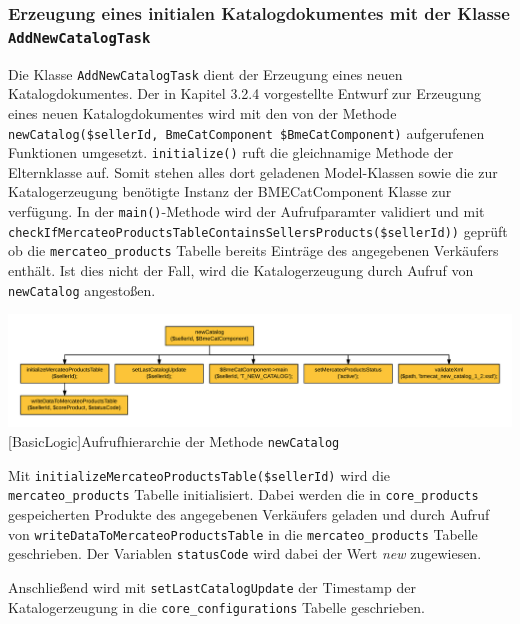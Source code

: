 	\subsubsection{Erzeugung eines initialen Katalogdokumentes mit der Klasse \texttt{AddNewCatalogTask}}
	
	Die Klasse \texttt{AddNewCatalogTask} dient der Erzeugung eines neuen Katalogdokumentes. Der in Kapitel 3.2.4 vorgestellte Entwurf zur Erzeugung eines neuen Katalogdokumentes wird mit den von der Methode \texttt{newCatalog(\$sellerId, BmeCatComponent \$BmeCatComponent)} aufgerufenen Funktionen umgesetzt.
	\texttt{initialize()} ruft die gleichnamige Methode der Elternklasse auf. Somit stehen alles dort geladenen Model-Klassen sowie die zur Katalogerzeugung benötigte Instanz der BMECatComponent Klasse zur verfügung.
	In der \texttt{main()}-Methode wird der Aufrufparamter validiert und mit \texttt{checkIfMercateoProductsTableContainsSellersProducts(\$sellerId))} geprüft ob die \texttt{mercateo\_products} Tabelle bereits Einträge des angegebenen Verkäufers enthält. Ist dies nicht der Fall, wird die Katalogerzeugung durch Aufruf von \texttt{newCatalog} angestoßen.
	
	 
	\begin{minipage}{\linewidth}
		\vspace{1em}
		\centering
		\includegraphics[width=1 \linewidth]{img/newCatalogAufrufhierarchie}
		[BasicLogic]{Aufrufhierarchie der Methode \texttt{newCatalog}}
		\vspace{1em}
	\end{minipage}

	
	Mit \texttt{initializeMercateoProductsTable(\$sellerId)} wird die \texttt{mercateo\_products} Tabelle initialisiert. Dabei werden die in \texttt{core\_products} gespeicherten Produkte des angegebenen Verkäufers geladen und durch Aufruf von \texttt{writeDataToMercateoProductsTable} in die \texttt{mercateo\_products} Tabelle geschrieben. Der Variablen \texttt{statusCode} wird dabei der Wert \textit{new} zugewiesen. 
	
	Anschließend wird mit \texttt{setLastCatalogUpdate} der Timestamp der Katalogerzeugung in die \texttt{core\_configurations} Tabelle geschrieben.
		
